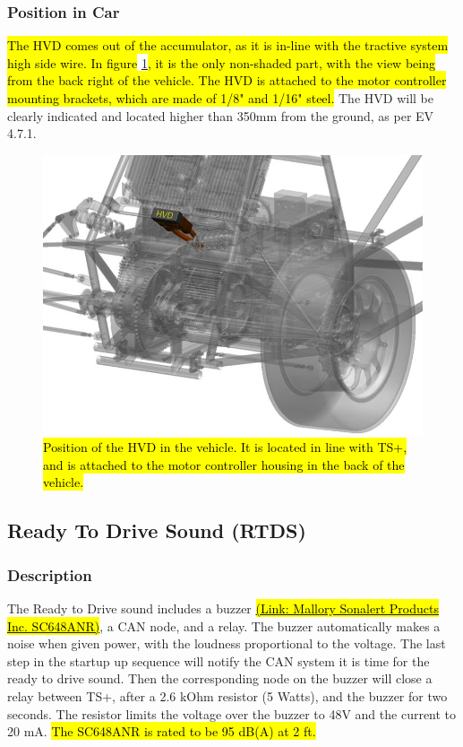 \documentclass{article}
\DeclareRobustCommand{\hlr}[1]{{\sethlcolor{red}\hl{#1}}}
\begin{document}
        \subsubsection{Position in Car}

            \hlr{The HVD comes out of the accumulator, as it is in-line with the tractive system high side wire. In figure} \ref{hvdlocation}\hlr{, it is the only non-shaded part, with the view being from the back right of the vehicle. The HVD is attached to the motor controller mounting brackets, which are made of 1/8" and 1/16" steel.} The HVD will be clearly indicated and located higher than 350mm from the ground, as per EV 4.7.1.


        \begin{figure}[H]
            \centering
            \includegraphics[width = 0.6 \textwidth]{hvd_position}
            \caption{\hlr{Position of the HVD in the vehicle. It is located in line with TS+, and is attached to the motor controller housing in the back of the vehicle. }}
            \label{hvdlocation}
        \end{figure}

    \subsection{Ready To Drive Sound (RTDS)} \label{R2Dsection}

        \subsubsection{Description}

            The Ready to Drive sound includes a buzzer \href{http://www.mallory-sonalert.com/Specifications/SC648ANR.pdf}{\hlr{(Link: Mallory Sonalert Products Inc. SC648ANR)}}, a CAN node, and a relay. The buzzer automatically makes a noise when given power, with the loudness proportional to the voltage. The last step in the startup up sequence will notify the CAN system it is time for the ready to drive sound. Then the corresponding node on the buzzer will close a relay between TS+, after a 2.6 kOhm resistor (5 Watts), and the buzzer for two seconds. The resistor limits the voltage over the buzzer to 48V and the current to 20 mA. \hlr{The SC648ANR is rated to be 95 dB(A) at 2 ft.}
\end{document}
